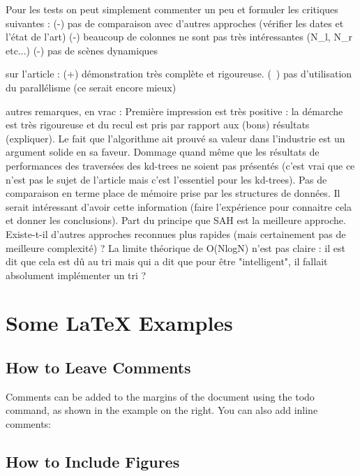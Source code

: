 \documentclass[a4paper]{article}
\begin{document}
Pour les tests on peut simplement commenter un peu et formuler les critiques suivantes :
(-) pas de comparaison avec d'autres approches (vérifier les dates et l'état de l'art)
(-) beaucoup de colonnes ne sont pas très intéressantes (N_l, N_r etc...)
(-) pas de scènes dynamiques

sur l'article :
(+) démonstration très complète et rigoureuse.
(~) pas d'utilisation du parallélisme (ce serait encore mieux)

autres remarques, en vrac :
Première impression est très positive : la démarche est très rigoureuse et du recul est pris par rapport aux (bons) résultats (expliquer). Le fait que l'algorithme ait prouvé sa valeur dans l'industrie est un argument solide en sa faveur. Dommage quand même que les résultats de performances des traversées des kd-trees ne soient pas présentés (c'est vrai que ce n'est pas le sujet de l'article mais c'est l'essentiel pour les kd-trees).
	Pas de comparaison en terme place de mémoire prise par les structures de données. Il serait intéressant d'avoir cette information (faire l'expérience pour connaitre cela et donner les conclusions).
	Part du principe que SAH est la meilleure approche. Existe-t-il d'autres approches reconnues plus rapides (mais certainement pas de meilleure complexité) ?
	La limite théorique de O(NlogN) n'est pas claire : il est dit que cela est dû au tri mais qui a dit que pour être "intelligent", il fallait absolument implémenter un tri ?
	

\section{Some \LaTeX{} Examples}
\label{sec:examples}

\subsection{How to Leave Comments}

Comments can be added to the margins of the document using the  todo command, as shown in the example on the right. You can also add inline comments:


\subsection{How to Include Figures}
\end{document}
